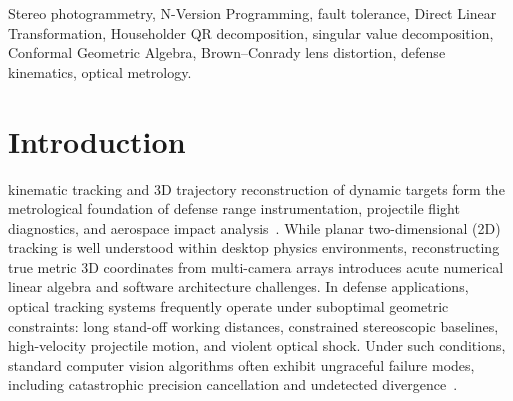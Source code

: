 \documentclass[journal]{IEEEtran}
\begin{document}
\begin{IEEEkeywords}
Stereo photogrammetry, N-Version Programming, fault tolerance, Direct Linear Transformation, Householder QR decomposition, singular value decomposition, Conformal Geometric Algebra, Brown--Conrady lens distortion, defense kinematics, optical metrology.
\end{IEEEkeywords}

\section{Introduction}
 kinematic tracking and 3D trajectory reconstruction of dynamic targets form the metrological foundation of defense range instrumentation, projectile flight diagnostics, and aerospace impact analysis~\cite{abdel1971direct,hartley2004multiple}. While planar two-dimensional (2D) tracking is well understood within desktop physics environments, reconstructing true metric 3D coordinates from multi-camera arrays introduces acute numerical linear algebra and software architecture challenges. In defense applications, optical tracking systems frequently operate under suboptimal geometric constraints: long stand-off working distances, constrained stereoscopic baselines, high-velocity projectile motion, and violent optical shock. Under such conditions, standard computer vision algorithms often exhibit ungraceful failure modes, including catastrophic precision cancellation and undetected divergence~\cite{golub2013matrix,higham2002accuracy}.
\end{document}

